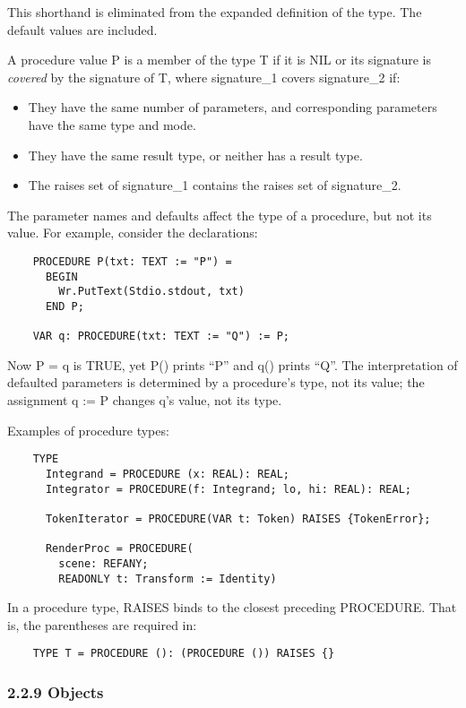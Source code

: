\documentclass[10pt]{article}
\begin{document}
  This shorthand is eliminated from the expanded definition of the type. The default values are included. 


 A procedure value P is a member of the type T if it is NIL or its signature is \emph{covered}
 by the signature of T, where signature\_1 covers signature\_2 if: 
\begin{itemize}
\item  They have the same number of parameters, and corresponding parameters have the same type and mode. 
\item  They have the same result type, or neither has a result type. 
\item  The raises set of signature\_1 contains the raises set of signature\_2. 
\end{itemize}



  The parameter names and defaults affect the type of a procedure, but not its value. For example, consider the declarations: 
\begin{verbatim}
    PROCEDURE P(txt: TEXT := "P") = 
      BEGIN
        Wr.PutText(Stdio.stdout, txt)
      END P;

    VAR q: PROCEDURE(txt: TEXT := "Q") := P;
\end{verbatim}
 Now P = q is TRUE, yet P() prints ``P'' and q() prints ``Q''. The interpretation of defaulted parameters is determined by a procedure's type, not its value; the assignment q := P changes q's value, not its type. 


  Examples of procedure types: 
\begin{verbatim}
    TYPE
      Integrand = PROCEDURE (x: REAL): REAL;
      Integrator = PROCEDURE(f: Integrand; lo, hi: REAL): REAL;

      TokenIterator = PROCEDURE(VAR t: Token) RAISES {TokenError};

      RenderProc = PROCEDURE(
        scene: REFANY;
        READONLY t: Transform := Identity)
\end{verbatim}



 In a procedure type, RAISES binds to the closest preceding PROCEDURE. That is, the parentheses are required in: 
\begin{verbatim}
    TYPE T = PROCEDURE (): (PROCEDURE ()) RAISES {}
\end{verbatim}



 
\subsubsection*{2.2.9 Objects}
\end{document}

